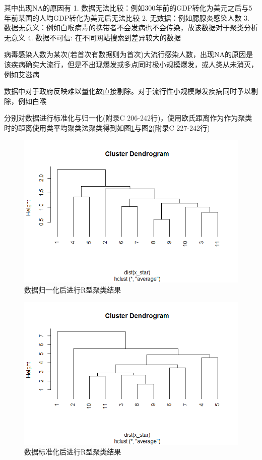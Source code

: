 \documentclass[a4paper, 11pt,twoside=true,UTF8]{scrartcl}
\begin{document}
其中出现NA的原因有 1. 数据无法比较：例如300年前的GDP转化为美元之后与5年前某国的人均GDP转化为美元后无法比较 2. 无数据：例如腮腺炎感染人数 3. 数据无意义：例如白喉病毒的携带者不会发病也不会传染，故该数据对于聚类分析无意义 4. 数据不可信: 在不同网站搜索到差异较大的数据

病毒感染人数为某次(若首次有数据则为首次)大流行感染人数，出现NA的原因是该疾病确实大流行，但是不出现爆发或多点同时极小规模爆发，或人类从未消灭，例如艾滋病

数据中对于政府反映难以量化故直接剔除。对于流行性小规模爆发疾病同时予以剔除，例如白喉

分别对数据进行标准化与归一化(附录C 206-242行)，使用欧氏距离作为作为聚类时的距离使用类平均聚类法聚类得到如图\ref{P3F3}与图\ref{P3F4}(附录C 227-242行)

\begin{figure}[H]
	\small
	\centering
	\includegraphics[width=11.5cm]{P3F4}
	\caption{数据归一化后进行R型聚类结果} \label{P3F3}
\end{figure}
\begin{figure}[h]
	\small
	\centering
	\includegraphics[width=11.5cm]{P3F3}
	\caption{数据标准化后进行R型聚类结果} \label{P3F4}
\end{figure}
\end{document}
